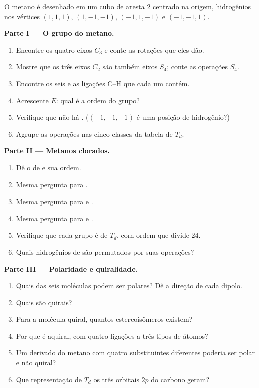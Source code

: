 \begin{problem}
\label{pb:b3:point-groups:1}
O metano é desenhado em um cubo de aresta 2 centrado na origem,
hidrogênios nos vértices $(1,1,1)$, $(1,-1,-1)$, $(-1,1,-1)$ e $(-1,-1,1)$.

\medskip\noindent\textbf{Parte I --- O grupo do metano.}
\begin{enumerate}
  \item Encontre os quatro eixos $C_3$ e conte as rotações que eles dão.
  \item Mostre que os três eixos $C_2$ são também eixos $S_4$; conte as
        operações $S_4$.
  \item Encontre os seis  e as ligações C--H que cada um contém.
  \item Acrescente $E$: qual é a ordem do grupo?
  \item Verifique que não há . ($(-1,-1,-1)$ é uma posição
        de hidrogênio?)
  \item Agrupe as operações nas cinco classes da tabela de $T_d$.
\end{enumerate}

\medskip\noindent\textbf{Parte II --- Metanos clorados.}
\begin{enumerate}[resume]
  \item Dê o  de  e sua ordem.
  \item Mesma pergunta para .
  \item Mesma pergunta para  e .
  \item Mesma pergunta para  e .
  \item Verifique que cada grupo é  de $T_d$, com ordem que divide 24.
  \item Quais hidrogênios de  são permutados por suas operações?
\end{enumerate}

\medskip\noindent\textbf{Parte III --- Polaridade e quiralidade.}
\begin{enumerate}[resume]
  \item Quais das seis moléculas podem ser polares? Dê a direção de cada
        dipolo.
  \item Quais são quirais?
  \item Para a molécula quiral, quantos estereoisômeros existem?
  \item Por que  é aquiral, com quatro ligações a três tipos de
        átomos?
  \item Um derivado do metano com quatro substituintes diferentes poderia ser
        polar e não quiral?
  \item Que representação de $T_d$ os três orbitais $2p$ do carbono
        geram?
\end{enumerate}


\end{problem}
